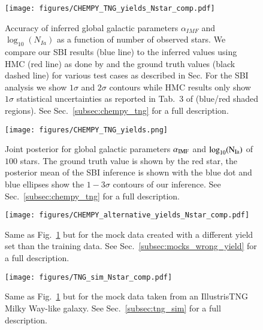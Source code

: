 \documentclass{aa}
\begin{document}
\begin{figure*}
    \centering
    \texttt{[image: figures/CHEMPY\_TNG\_yields\_Nstar\_comp.pdf]}
    \vspace{-.5cm}
    \caption{Accuracy of inferred global galactic parameters $\alpha_{IMF}$ and $\log_{10}(N_{Ia})$ as a function of number of observed stars. We compare our SBI results (blue line) to the inferred values using HMC (red line) as done by \cite{Philcox_2019} and the ground truth values (black dashed line) for various test cases as described in Sec. For the SBI analysis we show $1\sigma$ and $2\sigma$ contours while HMC results only show $1\sigma$ statistical uncertainties as reported in Tab.~3 of \citet{Philcox_2019} (blue/red shaded regions). See Sec.~\ref{subsec:chempy_tng} for a full description.}
    \label{fig:CHEMPY_TNG_N_star_analysis}
\end{figure*}

\begin{figure}
    \centering
    \texttt{[image: figures/CHEMPY\_TNG\_yields.png]}
    \vspace{-.25cm}
    \caption{Joint posterior for global galactic parameters $\alpha_{\rm IMF}$ and $\log_{10}(\rm N_{Ia})$ of $100$ stars. The ground truth value is shown by the red star, the posterior mean of the SBI inference is shown with the blue dot and blue ellipses show the $1-3\sigma$ contours of our inference.  See Sec.~\ref{subsec:chempy_tng} for a full description.}
    \label{fig:CHEMPY_TNG_sbi} 
\end{figure}
\begin{figure*}
    \centering
    \texttt{[image: figures/CHEMPY\_alternative\_yields\_Nstar\_comp.pdf]}
    \vspace{-.5cm}
    \caption{Same as Fig.~\ref{fig:CHEMPY_TNG_N_star_analysis} but for the mock data created with a different yield set than the training data. See Sec.~\ref{subsec:mocks_wrong_yield} for a full description.}
    \label{fig:CHEMPY_alt_N_star_analysis}
\end{figure*}
\begin{figure*}
    \centering
    \texttt{[image: figures/TNG\_sim\_Nstar\_comp.pdf]}
    \vspace{-.5cm}
    \caption{Same as Fig.~\ref{fig:CHEMPY_TNG_N_star_analysis} but for the mock data taken from an IllustrisTNG Milky Way-like galaxy. See Sec.~\ref{subsec:tng_sim} for a full description.}
    \label{fig:TNG_N_star_analysis}
\end{figure*}
\end{document}
